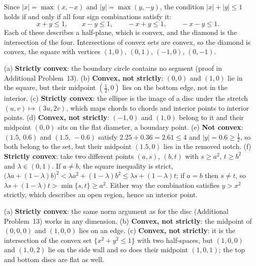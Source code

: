 \begin{solutions}
  \item Since $|x|=\max(x,-x)$ and $|y|=\max(y,-y)$, the condition
        $|x|+|y|\le 1$ holds if and only if all four sign combinations
        satisfy it:
        \[
          x+y\le 1,\qquad x-y\le 1,\qquad -x+y\le 1,\qquad -x-y\le 1 .
        \]
        Each of these describes a half-plane, which is convex, and the
        diamond is the intersection of the four. Intersections of convex
        sets are convex, so the diamond is convex, the square with
        vertices $(1,0)$, $(0,1)$, $(-1,0)$, $(0,-1)$.

  \item (a) \textbf{Strictly convex}: the boundary circle contains no
        segment (proof in Additional Problem~13).
        (b) \textbf{Convex, not strictly}: $(0,0)$ and $(1,0)$ lie in the
        square, but their midpoint $(\tfrac12,0)$ lies on the bottom edge,
        not in the interior.
        (c) \textbf{Strictly convex}: the ellipse is the image of a disc
        under the stretch $(u,v)\mapsto(3u,2v)$, which maps chords to chords
        and interior points to interior points.
        (d) \textbf{Convex, not strictly}: $(-1,0)$ and $(1,0)$ belong to it
        and their midpoint $(0,0)$ sits on the flat diameter, a boundary
        point.
        (e) \textbf{Not convex}: $(1.5,\,0.6)$ and $(1.5,\,-0.6)$ satisfy
        $2.25+0.36=2.61\le4$ and $|y|=0.6\ge\tfrac12$, so both belong to the
        set, but their midpoint $(1.5,0)$ lies in the removed notch.
        (f) \textbf{Strictly convex}: take two different points
        $(a,s)$, $(b,t)$ with $s\ge a^{2}$, $t\ge b^{2}$ and
        $\lambda\in(0,1)$. If $a\neq b$, the square inequality is strict,
        $\bigl(\lambda a+(1-\lambda)b\bigr)^{2}<\lambda a^{2}+(1-\lambda)b^{2}
        \le\lambda s+(1-\lambda)t$; if $a=b$ then $s\neq t$, so
        $\lambda s+(1-\lambda)t>\min\{s,t\}\ge a^{2}$. Either way the
        combination satisfies $y>x^{2}$ strictly, which describes an open
        region, hence an interior point.
  \item (a) \textbf{Strictly convex}: the same norm argument as for the
        disc (Additional Problem~13) works in any dimension.
        (b) \textbf{Convex, not strictly}: the midpoint of $(0,0,0)$ and
        $(1,0,0)$ lies on an edge.
        (c) \textbf{Convex, not strictly}: it is the intersection of the
        convex set $\{x^{2}+y^{2}\le1\}$ with two half-spaces, but
        $(1,0,0)$ and $(1,0,2)$ lie on the side wall and so does their
        midpoint $(1,0,1)$; the top and bottom discs are flat as well.

\end{solutions}
